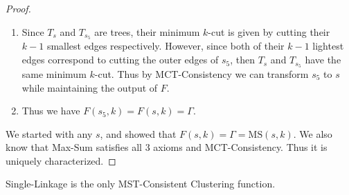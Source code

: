 \documentclass[twoside,11pt]{article}
\newcommand{\MS}{\text{MS}}
\begin{document}
\begin{proof}
\begin{enumerate}
\item Since $T_s$ and $T_{s_5}$ are trees, their minimum $k$-cut is given by cutting their $k-1$ smallest edges respectively.
However, since both of their $k-1$ lightest edges correspond to cutting the outer edges of $s_5$, then $T_s$ and $T_{s_5}$ have the same minimum $k$-cut. Thus
by MCT-Consistency we can transform $s_5$ to $s$ while maintaining the output of $F$.
	\item Thus we have $F(s_5,k) = F(s,k) = \Gamma$.
\end{enumerate}
We started with any $s$, and showed that $F(s,k) = \Gamma = \MS(s,k)$.
We also know that Max-Sum satisfies all 3 axioms and MCT-Consistency. Thus
it is uniquely characterized.
\end{proof}

\begin{theorem} \label{mainsl}
Single-Linkage is the only MST-Consistent Clustering function.
\end{theorem}
\end{document}
